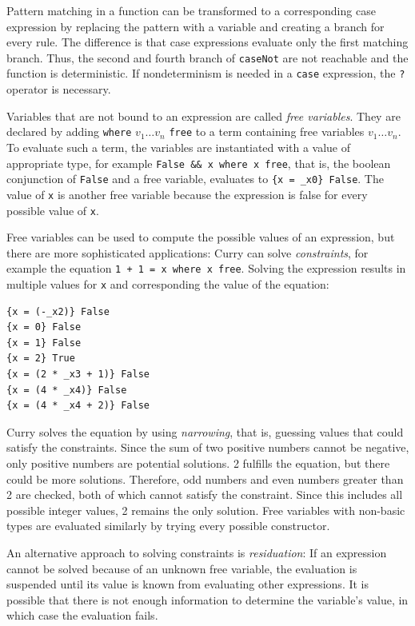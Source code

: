 \documentclass[fleqn, abstract=on]{scrreprt}
\begin{document}
Pattern matching in a function can be transformed to a corresponding case expression by replacing the pattern with a variable and creating a branch for every rule. The difference is that case expressions evaluate only the first matching branch. Thus, the second and fourth branch of \texttt{caseNot} are not reachable and the function is deterministic. If nondeterminism is needed in a \texttt{case} expression, the \texttt{?} operator is necessary.\\
\par\noindent
Variables that are not bound to an expression are called \textit{free variables}. They are declared by adding \texttt{where} $v_1\dots v_n$ \texttt{free} to a term containing free variables $v_1 \dots v_n$. To evaluate such a term, the variables are instantiated with a value of appropriate type, for example \texttt{False \&\& x where x free}, that is, the boolean conjunction of \texttt{False} and a free variable, evaluates to \texttt{\{x = \_x0\} False}. The value of \texttt{x} is another free variable because the expression is false for every possible value of \texttt{x}.
\par
Free variables can be used to compute the possible values of an expression, but there are more sophisticated applications: Curry can solve \textit{constraints}, for example the equation \texttt{1 + 1 = x where x free}. Solving the expression results in multiple values for \texttt{x} and corresponding the value of the equation:
\begin{verbatim}
{x = (-_x2)} False
{x = 0} False
{x = 1} False
{x = 2} True
{x = (2 * _x3 + 1)} False
{x = (4 * _x4)} False
{x = (4 * _x4 + 2)} False
\end{verbatim}
Curry solves the equation by using \textit{narrowing}, that is, guessing values that could satisfy the constraints. Since the sum of two positive numbers cannot be negative, only positive numbers are potential solutions. 2 fulfills the equation, but there could be more solutions. Therefore, odd numbers and even numbers greater than 2 are checked, both of which cannot satisfy the constraint. Since this includes all possible integer values, 2 remains the only solution. Free variables with non-basic types are evaluated similarly by trying every possible constructor.
\par 
An alternative approach to solving constraints is \textit{residuation}: If an expression cannot be solved because of an unknown free variable, the evaluation is suspended until its value is known from evaluating other expressions. It is possible that there is not enough information to determine the variable's value, in which case the evaluation fails.
\end{document}

